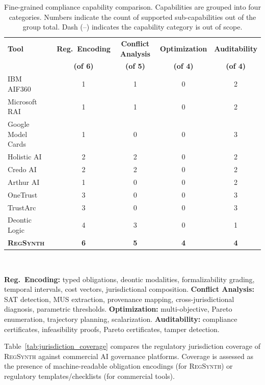 \documentclass[11pt,twocolumn]{article}
\newcommand{\regsynth}{\textsc{RegSynth}}
\begin{document}
\begin{table}[t]
\centering
\caption{Fine-grained compliance capability comparison. Capabilities are grouped
into four categories. Numbers indicate the count of supported sub-capabilities
out of the group total. Dash (--) indicates the capability category is out of scope.}
\label{tab:capability_coverage}
\small
\begin{tabular}{lcccc}
\toprule
\textbf{Tool} &
\textbf{Reg.\ Encoding} &
\textbf{Conflict Analysis} &
\textbf{Optimization} &
\textbf{Auditability} \\
& \textbf{(of 6)} & \textbf{(of 5)} & \textbf{(of 4)} & \textbf{(of 4)} \\
\midrule
IBM AIF360~\cite{ibmaif360} & 1 & 1 & 0 & 2 \\
Microsoft RAI~\cite{msrai2023} & 1 & 1 & 0 & 2 \\
Google Model Cards~\cite{googlemodelcards} & 1 & 0 & 0 & 3 \\
Holistic AI~\cite{holisticai2024} & 2 & 2 & 0 & 2 \\
Credo AI~\cite{credoai2024} & 2 & 2 & 0 & 2 \\
Arthur AI~\cite{arthurai2024} & 1 & 0 & 0 & 2 \\
OneTrust~\cite{onetrust2024} & 3 & 0 & 0 & 3 \\
TrustArc~\cite{trustarc2024} & 3 & 0 & 0 & 3 \\
Deontic Logic~\cite{governatori2013compliance} & 4 & 3 & 0 & 1 \\
\midrule
\textbf{\regsynth{}} & \textbf{6} & \textbf{5} & \textbf{4} & \textbf{4} \\
\bottomrule
\end{tabular}
\\[4pt]
\raggedright\scriptsize
\textbf{Reg.\ Encoding:} typed obligations, deontic modalities, formalizability grading,
temporal intervals, cost vectors, jurisdictional composition. \textbf{Conflict Analysis:}
SAT detection, MUS extraction, provenance mapping, cross-jurisdictional diagnosis,
parametric thresholds. \textbf{Optimization:} multi-objective, Pareto enumeration,
trajectory planning, scalarization. \textbf{Auditability:} compliance certificates,
infeasibility proofs, Pareto certificates, tamper detection.
\end{table}

Table~\ref{tab:jurisdiction_coverage} compares the regulatory jurisdiction coverage
of \regsynth{} against commercial AI governance platforms. Coverage is assessed
as the presence of machine-readable obligation encodings (for \regsynth{}) or
regulatory templates/checklists (for commercial tools).
\end{document}
